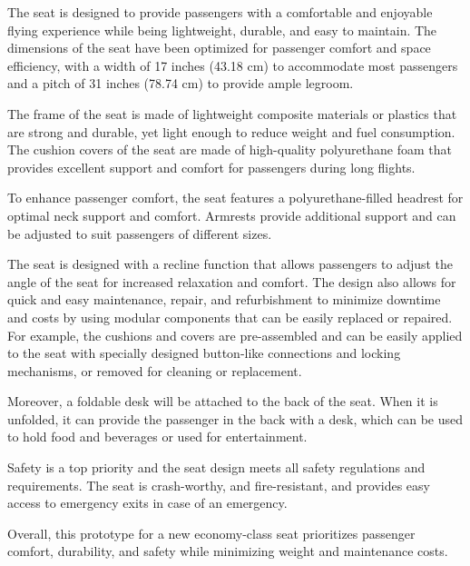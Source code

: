 The seat is designed to provide passengers with a comfortable and enjoyable flying experience while being lightweight, durable, and easy to maintain. The dimensions of the seat have been optimized for passenger comfort and space efficiency, with a width of 17 inches (43.18 cm) to accommodate most passengers and a pitch of 31 inches (78.74 cm) to provide ample legroom.

The frame of the seat is made of lightweight composite materials or plastics that are strong and durable, yet light enough to reduce weight and fuel consumption. The cushion covers of the seat are made of high-quality polyurethane foam that provides excellent support and comfort for passengers during long flights.

To enhance passenger comfort, the seat features a polyurethane-filled headrest for optimal neck support and comfort. Armrests provide additional support and can be adjusted to suit passengers of different sizes. 

The seat is designed with a recline function that allows passengers to adjust the angle of the seat for increased relaxation and comfort. The design also allows for quick and easy maintenance, repair, and refurbishment to minimize downtime and costs
by using modular components that can be easily replaced or repaired. For example, the cushions and covers are pre-assembled and can be easily applied to the seat with specially designed button-like connections and locking mechanisms, or removed for cleaning or replacement.

Moreover, a foldable desk will be attached to the back of the seat. When it is unfolded, it can provide the passenger in the back with a desk, which can be used to hold food and beverages or used for entertainment.

Safety is a top priority and the seat design meets all safety regulations and requirements. The seat is crash-worthy, and fire-resistant, and provides easy access to emergency exits in case of an emergency.

Overall, this prototype for a new economy-class seat prioritizes passenger comfort, durability, and safety while minimizing weight and maintenance costs.

